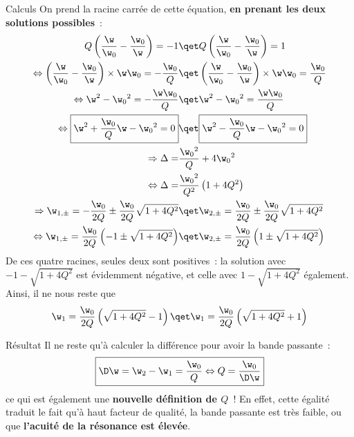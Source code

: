 \documentclass[../main/main.tex]{subfiles}
\begin{document}
\begin{rexem}{Calculs}
    On prend la racine carrée de cette équation, \textbf{en prenant les deux
    solutions possibles}~:
    \begin{align*}
        Q\left( \frac{\w}{\w_0} - \frac{\w_0}{\w} \right) = -1
        &\qet
        Q\left( \frac{\w}{\w_0} - \frac{\w_0}{\w} \right) = 1\\
        \Leftrightarrow
        \left( \frac{\w}{\w_0} - \frac{\w_0}{\w} \right)\times \w\w_0 =
            - \frac{\w_0}{Q}
        &\qet
        \left( \frac{\w}{\w_0} - \frac{\w_0}{\w} \right)\times \w\w_0 =
            \frac{\w_0}{Q}\\
        \Leftrightarrow
        \w^2 - \w_0{}^2 = -\frac{\w\w_0}{Q}
        &\qet
        \w^2 - \w_0{}^2 = \frac{\w\w_0}{Q}\\
        \Leftrightarrow
        \boxed{
        \w^2 + \frac{\w_0}{Q}\w - \w_0{}^2 = 0}
        &\qet
        \boxed{
        \w^2 - \frac{\w_0}{Q}\w - \w_0{}^2 = 0}\\
        \Rightarrow
        \Delta = &\frac{\w_0{}^2}{Q} + 4\w_0{}^2\\
        \Leftrightarrow
        \Delta = &\frac{\w_0{}^2}{Q^2} \left( 1 + 4Q^2 \right)\\
        \Rightarrow
        \w_{1,\pm} = -\frac{\w_0}{2Q} \pm \frac{\w_0}{2Q} \sqrt{1+4Q^2}
        &\qet
        \w_{2,\pm} = \frac{\w_0}{2Q} \pm \frac{\w_0}{2Q} \sqrt{1+4Q^2}\\
        \Leftrightarrow
        \w_{1,\pm} = \frac{\w_0}{2Q} \left(-1 \pm \sqrt{1+4Q^2}\right)
        &\qet
        \w_{2,\pm} = \frac{\w_0}{2Q} \left(1 \pm \sqrt{1+4Q^2}\right)
    \end{align*}
    De ces quatre racines, seules deux sont positives~: la solution avec $-1 -
    \sqrt{1+4Q^2}$ est évidemment négative, et celle avec $1 - \sqrt{1+4Q^2}$
    également. Ainsi, il ne nous reste que
    \begin{gather*}
        \w_1 = \frac{\w_0}{2Q} \left( \sqrt{1+4Q^2}-1 \right)
        \qet
        \w_1 = \frac{\w_0}{2Q} \left( \sqrt{1+4Q^2}+1 \right)
    \end{gather*}
\end{rexem}

\begin{rprop}{Résultat}
    Il ne reste qu'à calculer la différence pour avoir la bande passante~:
    \begin{gather*}
        \boxed{\D\w = \w_2 - \w_1 = \frac{\w_0}{Q}
            \Leftrightarrow
            Q = \frac{\w_0}{\D\w}
        }
    \end{gather*}
    ce qui est également une \textbf{nouvelle définition de $Q$}~! En effet, cette
    égalité traduit le fait qu'à haut facteur de qualité, la bande passante est très
    faible, ou que \textbf{l'acuité de la résonance est élevée}.
\end{rprop}
\end{document}
